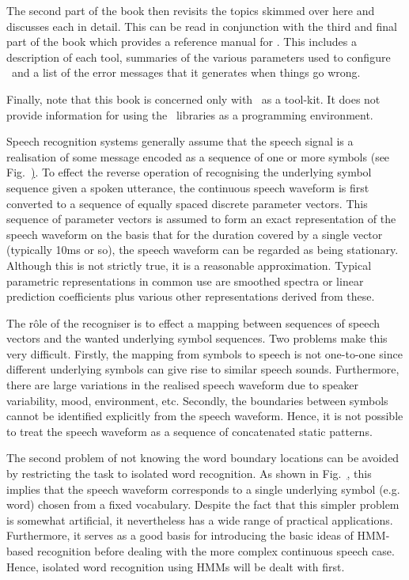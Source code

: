 The second part of the book then revisits the topics skimmed over here
and discusses each in detail. This can be 
read in conjunction with the third and final part
of the book which provides a reference manual for \HTK.  This includes
a description of each tool,  summaries of the various
parameters used to configure \HTK\ and a list of the error messages that
it generates when things go wrong.

Finally, note that this book is concerned only with \HTK\ as a tool-kit.
It does not provide  information for using the \HTK\ libraries as a programming
environment.


Speech recognition systems generally assume that the speech signal is
a  realisation of some message encoded as a sequence of one or more
symbols (see Fig.~\href{f:messencode} ). To effect the reverse
operation of recognising the underlying symbol sequence given a spoken
utterance, the continuous speech waveform is first converted to a
sequence of equally spaced discrete parameter vectors. This sequence
of parameter vectors is assumed to form an exact representation of
the speech waveform on the basis that for the duration covered by a
single vector (typically 10ms or so), the speech waveform can be
regarded as being stationary.  Although this is not strictly true, it
is  a reasonable approximation.  Typical parametric representations in
common use are smoothed spectra or linear prediction coefficients plus
various other representations derived from these.

The r\^{o}le of the recogniser is to effect a mapping between  sequences
of speech vectors and the wanted underlying symbol sequences.  Two
problems make this very difficult.  Firstly, the mapping from symbols
to speech is not one-to-one since different underlying symbols can
give rise to similar speech sounds.  Furthermore, there are large
variations in the realised speech waveform due to speaker variability,
mood, environment, etc.  Secondly, the boundaries between symbols
cannot be identified explicitly from the speech waveform.  Hence, it
is not possible to treat the speech waveform as a sequence of
concatenated static patterns. 

The second problem of not knowing the word boundary locations
can be avoided by restricting the task to
isolated word recognition.  As shown in Fig.~\href{f:isoprob},
this implies that the speech waveform corresponds to a single
underlying symbol (e.g. word) chosen from a fixed vocabulary.
Despite the fact that this
simpler problem is somewhat artificial, it nevertheless has 
a wide range of practical applications.
Furthermore, it serves as a good basis for 
introducing the basic ideas of HMM-based
recognition before dealing with the more complex continuous speech
case.  Hence, isolated word recognition using HMMs will be dealt
with first.

